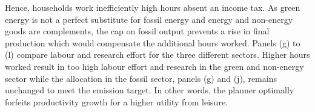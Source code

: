Hence, households work inefficiently high hours absent an income tax. %
As green energy is not a perfect substitute for fossil energy and energy and non-energy goods are complements, the cap on fossil output prevents a rise in final production which would compensate the additional hours worked. 
Panels (g) to (l) compare labour and research effort for the three different sectors. Higher hours worked result in too high labour effort and research in the green and non-energy sector while the allocation in the fossil sector, panels (g) and (j), remains unchanged to meet the emission target. In other words, the planner optimally forfeits productivity growth for a higher utility from leisure.

%
 
